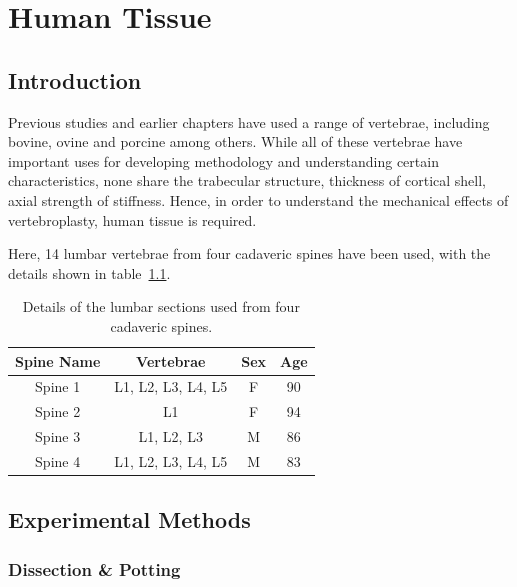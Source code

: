 \chapter{Human Tissue} \label{Chapter_HT}

\section{Introduction}

Previous studies and earlier chapters have used a range of vertebrae, including bovine, ovine and porcine among others. While all of these vertebrae have important uses for developing methodology and understanding certain characteristics, none share the trabecular structure, thickness of cortical shell, axial strength of stiffness. Hence, in order to understand the mechanical effects of vertebroplasty, human tissue is required.

Here, 14 lumbar vertebrae from four cadaveric spines have been used, with the details shown in table~\ref{tab:vertebrae}.

\begin{table}[ht!]
\centering
  \caption{Details of the lumbar sections used from four cadaveric spines.}
  \label{tab:vertebrae}
  \begin{tabular}{c|c|c|c}
    Spine Name & Vertebrae & Sex & Age \\ \hline \hline
    Spine 1& L1, L2, L3, L4, L5 & F & 90\\ \hline
    Spine 2& L1 & F & 94\\ \hline
    Spine 3& L1, L2, L3 & M & 86\\ \hline
    Spine 4& L1, L2, L3, L4, L5 & M & 83\\ \hline

  \end{tabular}

\end{table}


\section{Experimental Methods}

\subsection{Dissection \& Potting}

